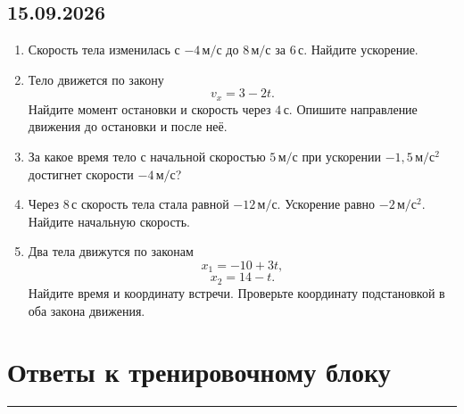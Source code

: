 \documentclass[a4paper,12pt]{article}
\newcommand{\sectionline}{%
  \par\vspace{-0.5em}%
  \noindent\textcolor{accent}{\rule{\linewidth}{0.7pt}}%
  \par\vspace{0.5em}%
}
\begin{document}

\subsection*{15.09.2026}

\begin{enumerate}[label=\textbf{\arabic*.}]

  \item Скорость тела изменилась с
  \(-4\,\text{м}/\text{с}\)
  до
  \(8\,\text{м}/\text{с}\)
  за
  \(6\,\text{с}\).
  Найдите ускорение.

  \item Тело движется по закону
  \[
    v_x=3-2t.
  \]
  Найдите момент остановки и скорость через
  \(4\,\text{с}\).
  Опишите направление движения до остановки и после неё.

  \item За какое время тело с начальной скоростью
  \(5\,\text{м}/\text{с}\)
  при ускорении
  \(-1{,}5\,\text{м}/\text{с}^2\)
  достигнет скорости
  \(-4\,\text{м}/\text{с}\)?

  \item Через
  \(8\,\text{с}\)
  скорость тела стала равной
  \(-12\,\text{м}/\text{с}\).
  Ускорение равно
  \(-2\,\text{м}/\text{с}^2\).
  Найдите начальную скорость.

  \item Два тела движутся по законам
  \[
    x_1=-10+3t,
  \]
  \[
    x_2=14-t.
  \]
  Найдите время и координату встречи.
  Проверьте координату подстановкой в оба закона движения.

\end{enumerate}


\clearpage

\section*{Ответы к тренировочному блоку}
\sectionline
\end{document}

